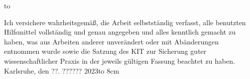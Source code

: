 \thispagestyle{empty}
\vspace*{32\baselineskip}
\hbox to \textwidth{\hrulefill}
\par
Ich versichere wahrheitsgemäß, die Arbeit selbstständig verfasst, alle benutzten Hilfsmittel vollständig und genau angegeben und alles kenntlich gemacht zu haben, was aus Arbeiten anderer unverändert oder mit Abänderungen entnommen wurde sowie die Satzung des KIT zur Sicherung guter wissenschaftlicher Praxis in der jeweils gültigen Fassung beachtet zu haben.
\vspace*{2cm}
\\Karlsruhe, den ??. ?????? 2023\hfill \hbox to 8cm{\hrulefill}

\clearpage






